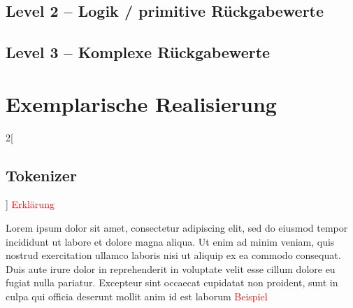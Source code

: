   \subsection{Level 2 -- Logik / primitive Rückgabewerte}
  \label{ssec:Level 2 -- Logik / primitive Rückgabewerte}
  \subsection{Level 3 -- Komplexe Rückgabewerte}
  \label{ssec:Level 3 -- Komplexe Rückgabewerte}

\section{Exemplarische Realisierung}
\label{sec:Exemplarische Realisierung}



  \begin{paracol}{2}[\subsection{Tokenizer}]
    \textcolor{red}{Erklärung}

    Lorem ipsum dolor sit amet, consectetur adipiscing elit, sed do eiusmod tempor incididunt ut labore et dolore magna aliqua. Ut enim ad minim veniam, quis nostrud exercitation ullamco laboris nisi ut aliquip ex ea commodo consequat. Duis aute irure dolor in reprehenderit in voluptate velit esse cillum dolore eu fugiat nulla pariatur. Excepteur sint occaecat cupidatat non proident, sunt in culpa qui officia deserunt mollit anim id est laborum
    \switchcolumn
    \textcolor{red}{Beispiel}
  \end{paracol}


